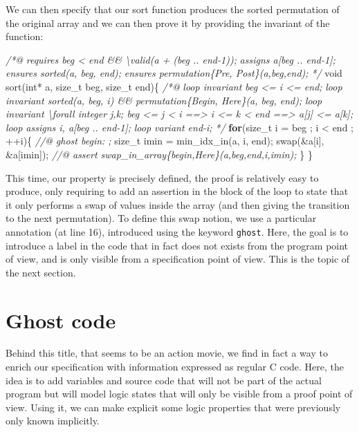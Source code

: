 \documentclass[12pt,francais,]{scrbook}
\newenvironment{Shaded}{}{}
\newcommand{\KeywordTok}[1]{\textcolor[rgb]{0.00,0.44,0.13}{\textbf{{#1}}}}
\newcommand{\DataTypeTok}[1]{\textcolor[rgb]{0.56,0.13,0.00}{{#1}}}
\newcommand{\CommentTok}[1]{\textcolor[rgb]{0.38,0.63,0.69}{\textit{{#1}}}}
\newcommand{\NormalTok}[1]{{#1}}
\begin{document}
We can then specify that our sort function produces the sorted
permutation of the original array and we can then prove it by providing
the invariant of the function:

\begin{footnotesize}\begin{Shaded}
\begin{Highlighting}[]
\CommentTok{/*@}
\CommentTok{  requires beg < end && \textbackslash{}valid(a + (beg .. end-1));}
\CommentTok{  assigns  a[beg .. end-1];  }
\CommentTok{  ensures sorted(a, beg, end);}
\CommentTok{  ensures permutation\{Pre, Post\}(a,beg,end);}
\CommentTok{*/}
\DataTypeTok{void} \NormalTok{sort(}\DataTypeTok{int}\NormalTok{* a, size_t beg, size_t end)\{}
  \CommentTok{/*@}
\CommentTok{    loop invariant beg <= i <= end;}
\CommentTok{    loop invariant sorted(a, beg, i) && permutation\{Begin, Here\}(a, beg, end);}
\CommentTok{    loop invariant \textbackslash{}forall integer j,k; beg <= j < i ==> i <= k < end ==> a[j] <= a[k];}
\CommentTok{    loop assigns i, a[beg .. end-1];}
\CommentTok{    loop variant end-i;}
\CommentTok{  */}
  \KeywordTok{for}\NormalTok{(size_t i = beg ; i < end ; ++i)\{}
    \CommentTok{//@ ghost begin: ;}
    \NormalTok{size_t imin = min_idx_in(a, i, end);}
    \NormalTok{swap(&a[i], &a[imin]);}
    \CommentTok{//@ assert swap_in_array\{begin,Here\}(a,beg,end,i,imin);}
  \NormalTok{\}}
\NormalTok{\}}
\end{Highlighting}
\end{Shaded}\end{footnotesize}

This time, our property is precisely defined, the proof is relatively
easy to produce, only requiring to add an assertion in the block of the
loop to state that it only performs a swap of values inside the array
(and then giving the transition to the next permutation). To define this
swap notion, we use a particular annotation (at line 16), introduced
using the keyword \texttt{ghost}. Here, the goal is to introduce a label
in the code that in fact does not exists from the program point of view,
and is only visible from a specification point of view. This is the
topic of the next section.

\section{Ghost code}\label{ghost-code}

Behind this title, that seems to be an action movie, we find in fact a
way to enrich our specification with information expressed as regular C
code. Here, the idea is to add variables and source code that will not
be part of the actual program but will model logic states that will only
be visible from a proof point of view. Using it, we can make explicit
some logic properties that were previously only known implicitly.
\end{document}
